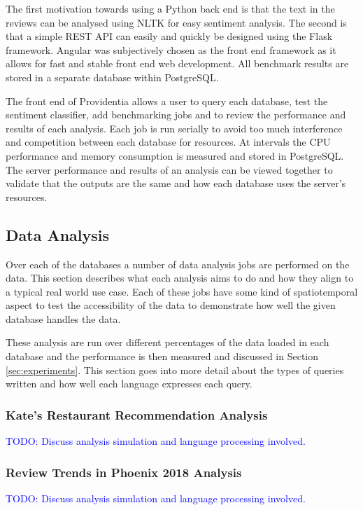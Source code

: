 The first motivation towards using a Python back end is that the text in the reviews can be analysed using NLTK for easy sentiment analysis. The second is that a simple REST API can easily and quickly be designed using the Flask framework. Angular was subjectively chosen as the front end framework as it allows for fast and stable front end web development. All benchmark results are stored in a separate database within PostgreSQL.

The front end of Providentia allows a user to query each database, test the sentiment classifier, add benchmarking jobs and to review the performance and results of each analysis. Each job is run serially to avoid too much interference and competition between each database for resources. At intervals the CPU performance and memory consumption is measured and stored in PostgreSQL. The server performance and results of an analysis can be viewed together to validate that the outputs are the same and how each database uses the server's resources.

\subsection{Data Analysis}
Over each of the databases a number of data analysis jobs are performed on the data. This section describes what each analysis aims to do and how they align to a typical real world use case. Each of these jobs have some kind of spatiotemporal aspect to test the accessibility of the data to demonstrate how well the given database handles the data. 

These analysis are run over different percentages of the data loaded in each database and the performance is then measured and discussed in Section \ref{sec:experiments}. This section goes into more detail about the types of queries written and how well each language expresses each query.

\subsubsection{Kate's Restaurant Recommendation Analysis}
\textcolor{blue}{ TODO: Discuss analysis simulation and language processing involved.}

\subsubsection{Review Trends in Phoenix 2018 Analysis}
\textcolor{blue}{ TODO: Discuss analysis simulation and language processing involved.}

